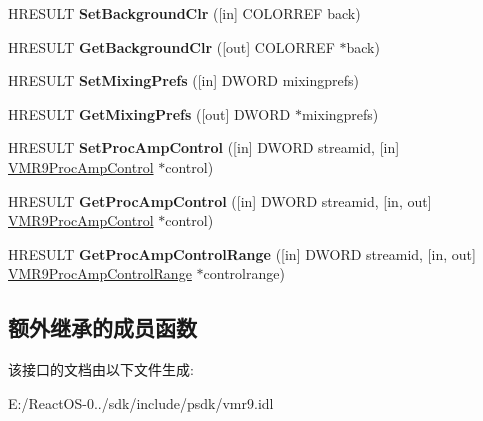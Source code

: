 \begin{DoxyCompactItemize}
H\+R\+E\+S\+U\+LT {\bfseries Set\+Background\+Clr} (\mbox{[}in\mbox{]} C\+O\+L\+O\+R\+R\+EF back)
\item 
\mbox{\label{interface_i_v_m_r_mixer_control9_a1e811f4c227c47620b59c1db589bdef7}} 
H\+R\+E\+S\+U\+LT {\bfseries Get\+Background\+Clr} (\mbox{[}out\mbox{]} C\+O\+L\+O\+R\+R\+EF $\ast$back)
\item 
\mbox{\label{interface_i_v_m_r_mixer_control9_a5afe1c9c7777dfdabd1168dbeb2f2b00}} 
H\+R\+E\+S\+U\+LT {\bfseries Set\+Mixing\+Prefs} (\mbox{[}in\mbox{]} D\+W\+O\+RD mixingprefs)
\item 
\mbox{\label{interface_i_v_m_r_mixer_control9_a7dff00af1c5db0e4bab39f2b6befc690}} 
H\+R\+E\+S\+U\+LT {\bfseries Get\+Mixing\+Prefs} (\mbox{[}out\mbox{]} D\+W\+O\+RD $\ast$mixingprefs)
\item 
\mbox{\label{interface_i_v_m_r_mixer_control9_a64d76346149bab25e38491d6a2a30bb6}} 
H\+R\+E\+S\+U\+LT {\bfseries Set\+Proc\+Amp\+Control} (\mbox{[}in\mbox{]} D\+W\+O\+RD streamid, \mbox{[}in\mbox{]} \hyperlink{struct___v_m_r9_proc_amp_control}{V\+M\+R9\+Proc\+Amp\+Control} $\ast$control)
\item 
\mbox{\label{interface_i_v_m_r_mixer_control9_abd09bb5297ed035a6d362e30842016eb}} 
H\+R\+E\+S\+U\+LT {\bfseries Get\+Proc\+Amp\+Control} (\mbox{[}in\mbox{]} D\+W\+O\+RD streamid, \mbox{[}in, out\mbox{]} \hyperlink{struct___v_m_r9_proc_amp_control}{V\+M\+R9\+Proc\+Amp\+Control} $\ast$control)
\item 
\mbox{\label{interface_i_v_m_r_mixer_control9_aaa927ee0be986e0780dbe7a040d5ceea}} 
H\+R\+E\+S\+U\+LT {\bfseries Get\+Proc\+Amp\+Control\+Range} (\mbox{[}in\mbox{]} D\+W\+O\+RD streamid, \mbox{[}in, out\mbox{]} \hyperlink{struct___v_m_r9_proc_amp_control_range}{V\+M\+R9\+Proc\+Amp\+Control\+Range} $\ast$controlrange)
\end{DoxyCompactItemize}
\subsection*{额外继承的成员函数}


该接口的文档由以下文件生成\+:\begin{DoxyCompactItemize}
\item 
E\+:/\+React\+O\+S-\/0../sdk/include/psdk/vmr9.\+idl\end{DoxyCompactItemize}
